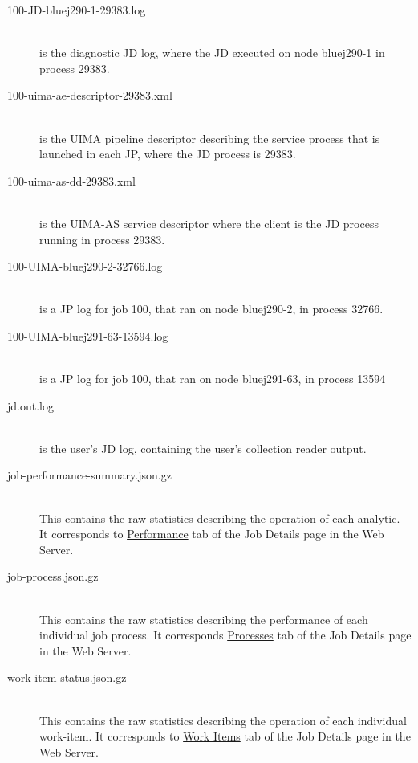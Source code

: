 \begin{description}
     \item[100-JD-bluej290-1-29383.log]  \hfill \\
       is the diagnostic JD log, where the JD executed on node
       bluej290-1 in process 29383.

     \item[100-uima-ae-descriptor-29383.xml]  \hfill \\
       is the UIMA pipeline descriptor describing the
       service process that is launched in each JP, where the JD process is 29383.

     \item[100-uima-as-dd-29383.xml]  \hfill \\
       is the UIMA-AS service descriptor where the client is
       the JD process running in process 29383.

     \item[100-UIMA-bluej290-2-32766.log]  \hfill \\
       is a JP log for job 100, that ran on node
       bluej290-2, in process 32766.

     \item[100-UIMA-bluej291-63-13594.log]  \hfill \\
       is a JP log for job 100, that ran on node
       bluej291-63, in process 13594

     \item[jd.out.log]  \hfill \\
       is the user's JD log, containing the user's collection reader output.

     \item[job-performance-summary.json.gz]  \hfill \\
       This contains the raw statistics describing
       the operation of each analytic.  It corresponds to \hyperref[sec:performance]{Performance}
       tab of the Job Details page in the Web Server.

     \item[job-process.json.gz]  \hfill \\
       This contains the raw statistics describing
       the performance of each individual job process.  It corresponds \hyperref[sec:ws-processes]{Processes}
       tab of the Job Details page in the Web Server.

     \item[work-item-status.json.gz]  \hfill \\
       This contains the raw statistics describing
       the operation of each individual work-item.  It corresponds to \hyperref[sec:ws-work-items]{Work Items}
       tab of the Job Details page in the Web Server.
 \end{description}
     
